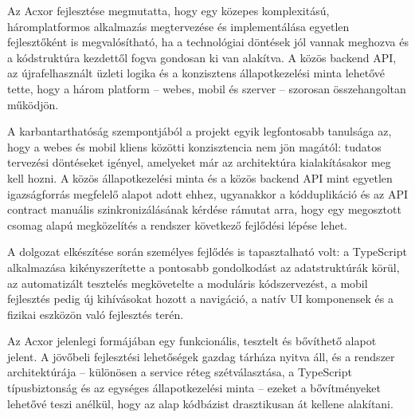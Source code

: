 

Az Acxor fejlesztése megmutatta, hogy egy közepes komplexitású, háromplatformos alkalmazás megtervezése és implementálása egyetlen fejlesztőként is megvalósítható, ha a technológiai döntések jól vannak meghozva és a kódstruktúra kezdettől fogva gondosan ki van alakítva. A közös backend API, az újrafelhasznált üzleti logika és a konzisztens állapotkezelési minta lehetővé tette, hogy a három platform -- webes, mobil és szerver -- szorosan összehangoltan működjön.

A karbantarthatóság szempontjából a projekt egyik legfontosabb tanulsága az, hogy a webes és mobil kliens közötti konzisztencia nem jön magától: tudatos tervezési döntéseket igényel, amelyeket már az architektúra kialakításakor meg kell hozni. A közös állapotkezelési minta és a közös backend API mint egyetlen igazságforrás megfelelő alapot adott ehhez, ugyanakkor a kódduplikáció és az API contract manuális szinkronizálásának kérdése rámutat arra, hogy egy megosztott csomag alapú megközelítés a rendszer következő fejlődési lépése lehet.

A dolgozat elkészítése során személyes fejlődés is tapasztalható volt: a TypeScript alkalmazása kikényszerítette a pontosabb gondolkodást az adatstruktúrák körül, az automatizált tesztelés megkövetelte a moduláris kódszervezést, a mobil fejlesztés pedig új kihívásokat hozott a navigáció, a natív UI komponensek és a fizikai eszközön való fejlesztés terén.

Az Acxor jelenlegi formájában egy funkcionális, tesztelt és bővíthető alapot jelent. A jövőbeli fejlesztési lehetőségek gazdag tárháza nyitva áll, és a rendszer architektúrája -- különösen a service réteg szétválasztása, a TypeScript típusbiztonság és az egységes állapotkezelési minta -- ezeket a bővítményeket lehetővé teszi anélkül, hogy az alap kódbázist drasztikusan át kellene alakítani.